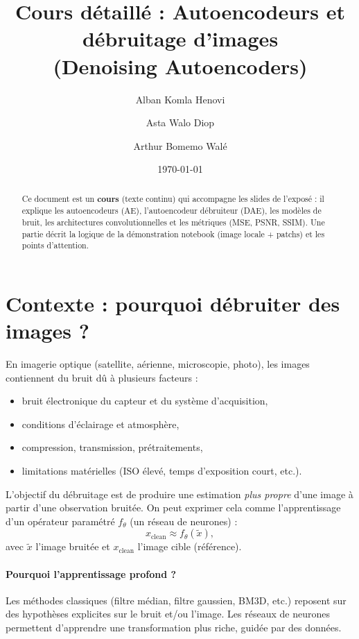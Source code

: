\documentclass[11pt,a4paper]{article}
\title{Cours détaillé : Autoencodeurs et débruitage d'images\\(Denoising Autoencoders)}
\author{Alban Komla Henovi \and Asta Walo Diop \and Arthur Bomemo Walé}
\date{\today}
\begin{document}
\maketitle

\begin{abstract}
Ce document est un \textbf{cours} (texte continu) qui accompagne les slides de l'exposé : il explique les autoencodeurs (AE), l'autoencodeur débruiteur (DAE), les modèles de bruit, les architectures convolutionnelles et les métriques (MSE, PSNR, SSIM). Une partie décrit la logique de la démonstration notebook (image locale + patchs) et les points d'attention.
\end{abstract}

\tableofcontents

\section{Contexte : pourquoi débruiter des images ?}

En imagerie optique (satellite, aérienne, microscopie, photo), les images contiennent du bruit dû à plusieurs facteurs :
\begin{itemize}
  \item bruit électronique du capteur et du système d'acquisition,
  \item conditions d'éclairage et atmosphère,
  \item compression, transmission, prétraitements,
  \item limitations matérielles (ISO élevé, temps d'exposition court, etc.).
\end{itemize}

L'objectif du débruitage est de produire une estimation \emph{plus propre} d'une image à partir d'une observation bruitée.
On peut exprimer cela comme l'apprentissage d'un opérateur paramétré $f_\theta$ (un réseau de neurones) :
\begin{equation}
  x_{\text{clean}} \approx f_\theta(\tilde{x}),
\end{equation}
avec $\tilde{x}$ l'image bruitée et $x_{\text{clean}}$ l'image cible (référence).

\paragraph{Pourquoi l'apprentissage profond ?}
Les méthodes classiques (filtre médian, filtre gaussien, BM3D, etc.) reposent sur des hypothèses explicites sur le bruit et/ou l'image. Les réseaux de neurones permettent d'apprendre une transformation plus riche, guidée par des données.
\end{document}
